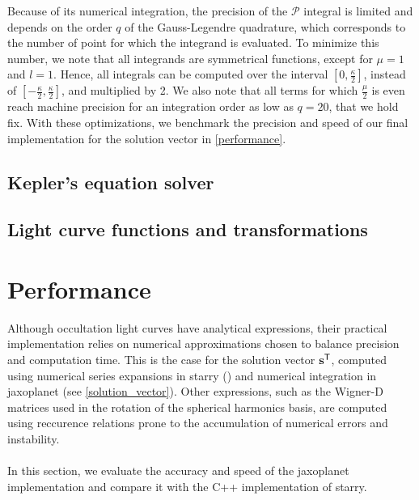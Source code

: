 \documentclass[modern]{aastex631}
\begin{document}
Because of its numerical integration, the precision of the $\mathcal{P}$ integral is limited and depends on the order $q$ of the Gauss-Legendre quadrature, which corresponds to the number of point for which the integrand is evaluated. To minimize this number, we note that all integrands are symmetrical functions, except for $\mu=1$ and $l=1$. Hence, all integrals can be computed over the interval $\left[0, \frac{\kappa}{2}\right]$, instead of $\left[-\frac{\kappa}{2}, \frac{\kappa}{2}\right]$, and multiplied by 2. We also note that all terms for which $\frac{\mu}{2}$ is even reach machine precision for an integration order as low as $q=20$, that we hold fix. With these optimizations, we benchmark the precision and speed of our final implementation for the solution vector in \autoref{performance}.

\subsection{Kepler's equation solver}
\todo{}
\subsection{Light curve functions and transformations}
\todo{}
    
\section{Performance}\label{performance}
Although occultation light curves have analytical expressions, their practical implementation relies on numerical approximations chosen to balance precision and computation time. This is the case for the solution vector ${\mathbf{s}}^\mathsf{T}$, computed using numerical series expansions in \textsf{starry} (\citealt[section D.2.3]{starry}) and numerical integration in \textsf{jaxoplanet} (see \autoref{solution_vector}). Other expressions, such as the Wigner-D matrices used in the rotation of the spherical harmonics basis, are computed using reccurence relations prone to the accumulation of numerical errors and instability.\\\\
In this section, we evaluate the accuracy and speed of the \textsf{jaxoplanet} implementation and compare it with the C++ implementation of \textsf{starry}.
\end{document}
